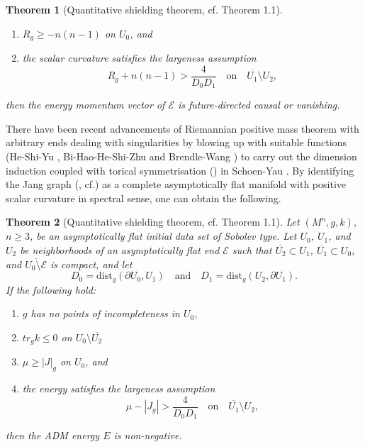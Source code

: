 \documentclass[11pt]{amsart}
\newcommand{\dist}{\mathrm{dist}}
\newtheorem{thm}{Theorem}[section]
\theoremstyle{remark}
\numberwithin{equation}{section}
\begin{document}
{{\begin{thm}[Quantitative shielding theorem, cf. \cite{LLU22} Theorem 1.1]
\begin{enumerate}
    \item $R_g\ge -n(n-1)$ on $U_0$, and 
    
    \item \label{scalar_bound} the scalar curvature satisfies the largeness assumption 
    \begin{equation}\label{largeness}
R_g+n(n-1)>\frac{4}{D_0 D_1}\quad \text{on}\quad\overline{U_1}\setminus U_2,
    \end{equation}
\end{enumerate}
then the energy momentum vector of $\mathcal E$ is future-directed causal or vanishing. 
\end{thm} 

There have been recent advancements of Riemannian positive mass theorem with arbitrary ends dealing with singularities by blowing up with suitable functions (He-Shi-Yu \cite{HSY}, Bi-Hao-He-Shi-Zhu \cite{BHHSZ} and Brendle-Wang \cite{BW1}) to carry out the dimension induction coupled with torical symmetrisation (\cite{FCS80}) in Schoen-Yau \cite{SY7}. By identifying the Jang graph (\cite{SY2, E3}, cf.\cite{Jang}) as a complete asymptotically flat manifold with positive scalar curvature in spectral sense, one can obtain the following. 

\begin{thm}[Quantitative shielding theorem, cf. \cite{LLU22} Theorem 1.1]\label{QST2} 
Let $(M^n,g, k)$, $n \ge 3$, be an asymptotically flat initial data set of Sobolev type.  Let $U_0$, $U_1$, and $U_2$ be neighborhoods of an asymptotically flat end $\mathcal E$ such that  $\overline{U_2}\subset U_1$, $\overline{U_1}\subset U_0$, and $\overline {U_0 \setminus \mathcal E}$ is compact,
and let 
$$D_0=\dist_g(\partial U_0, U_1)\quad\text{and}\quad
D_1 =\dist_g(U_2,\partial U_1).$$
If the following hold:
\begin{enumerate}
    \item $g$ has no points of incompleteness in $U_0$, 
    
    \item $tr_g k \leq 0$ on $U_0\setminus \overline {U_2}$    
   
    \item $\mu\geq |J|_g$ on $U_0$, and 
    
    \item \label{energyscalar_bound} the energy satisfies the largeness assumption 
    \begin{equation}\label{energylargeness}
\mu-|J_g|>\frac{4}{D_0 D_1}\quad \text{on}\quad\overline{U_1}\setminus U_2,
    \end{equation} 
\end{enumerate}
then the ADM energy $E$ is non-negative.  
\end{thm}

}}
\end{document}
